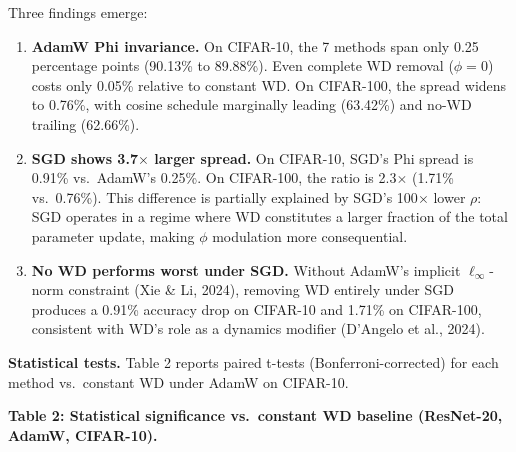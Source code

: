 \documentclass[
]{article}
\begin{document}
Three findings emerge:

\begin{enumerate}
\def\labelenumi{\arabic{enumi}.}
\item
  \textbf{AdamW Phi invariance.} On CIFAR-10, the 7 methods span only
  0.25 percentage points (90.13\% to 89.88\%). Even complete WD removal
  (\(\phi = 0\)) costs only 0.05\% relative to constant WD. On
  CIFAR-100, the spread widens to 0.76\%, with cosine schedule
  marginally leading (63.42\%) and no-WD trailing (62.66\%).
\item
  \textbf{SGD shows 3.7\(\times\) larger spread.} On CIFAR-10, SGD's Phi
  spread is 0.91\% vs.~AdamW's 0.25\%. On CIFAR-100, the ratio is
  2.3\(\times\) (1.71\% vs.~0.76\%). This difference is partially
  explained by SGD's 100\(\times\) lower \(\rho\): SGD operates in a
  regime where WD constitutes a larger fraction of the total parameter
  update, making \(\phi\) modulation more consequential.
\item
  \textbf{No WD performs worst under SGD.} Without AdamW's implicit
  \(\ell_\infty\)-norm constraint (Xie \& Li, 2024), removing WD
  entirely under SGD produces a 0.91\% accuracy drop on CIFAR-10 and
  1.71\% on CIFAR-100, consistent with WD's role as a dynamics modifier
  (D'Angelo et al., 2024).
\end{enumerate}

\textbf{Statistical tests.} Table 2 reports paired t-tests
(Bonferroni-corrected) for each method vs.~constant WD under AdamW on
CIFAR-10.

\textbf{Table 2: Statistical significance vs.~constant WD baseline
(ResNet-20, AdamW, CIFAR-10).}
\end{document}
